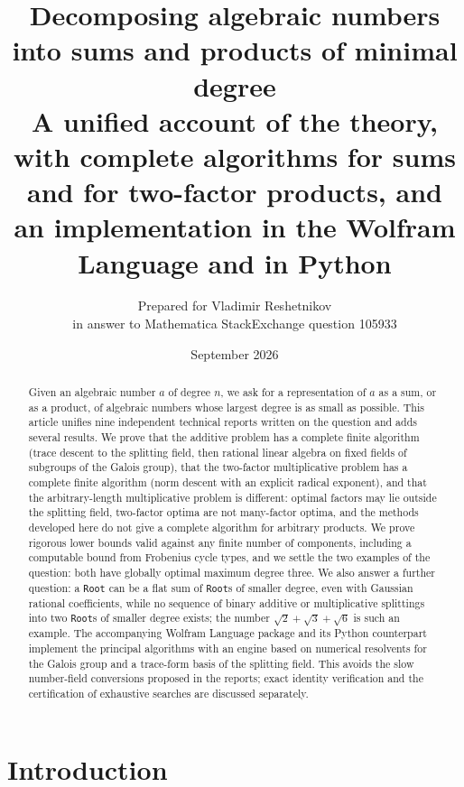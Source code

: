 \documentclass[11pt,a4paper]{article}
\title{Decomposing algebraic numbers into sums and products of minimal degree\\[4pt]
\large A unified account of the theory, with complete algorithms for sums and for two-factor products,
and an implementation in the Wolfram Language and in Python}
\author{Prepared for Vladimir Reshetnikov\\ \small in answer to Mathematica StackExchange question 105933}
\date{September 2026}
\theoremstyle{definition}
\theoremstyle{remark}
\newcommand{\code}[1]{\texttt{#1}}
\newcommand{\Root}{\code{Root}}
\begin{document}
\maketitle

\begin{abstract}
Given an algebraic number $a$ of degree $n$, we ask for a representation of $a$ as a sum, or as a
product, of algebraic numbers whose largest degree is as small as possible.  This article unifies nine
independent technical reports written on the question and adds several results.  We prove that the
additive problem has a complete finite algorithm (trace descent to the splitting field, then rational
linear algebra on fixed fields of subgroups of the Galois group), that the two-factor multiplicative
problem has a complete finite algorithm (norm descent with an explicit radical exponent), and that the
arbitrary-length multiplicative problem is different: optimal factors may lie outside the
splitting field, two-factor optima are not many-factor optima, and the methods developed here do not
give a complete algorithm for arbitrary products.  We
prove rigorous lower bounds valid against any finite number of components, including a computable bound
from Frobenius cycle types, and we settle the two examples of the question: both have globally optimal
maximum degree three.  We also answer a further question: a \Root{} can be a flat sum of \Root{}s of
smaller degree, even with Gaussian rational coefficients, while no sequence of binary additive or
multiplicative splittings into two \Root{}s of smaller degree exists; the number $\sqrt2+\sqrt3+\sqrt6$
is such an example.  The accompanying Wolfram Language package and its Python counterpart implement
the principal algorithms with an engine based on numerical resolvents for the Galois group and a trace-form basis of the
splitting field.  This avoids the slow number-field conversions proposed in the reports;
exact identity verification and the certification of exhaustive searches are discussed separately.
\end{abstract}

\tableofcontents

\section{Introduction}
\end{document}
